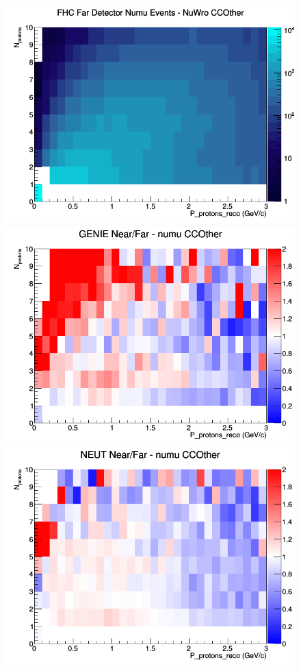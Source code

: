 \begin{figure}[h]
\endminipage
{}
\includegraphics[width=\linewidth]{eff_N_P/GAr/protons/CCOther_FHC_FD_numu_N_P_NuWro.png}
\endminipage
\newline
{}
\includegraphics[width=\linewidth]{eff_N_P/GAr/protons/ratios/CCOther_GENIE_numu_NF_N_P.png}
\endminipage
{}
\includegraphics[width=\linewidth]{eff_N_P/GAr/protons/ratios/CCOther_NEUT_numu_NF_N_P.png}

\end{figure}
